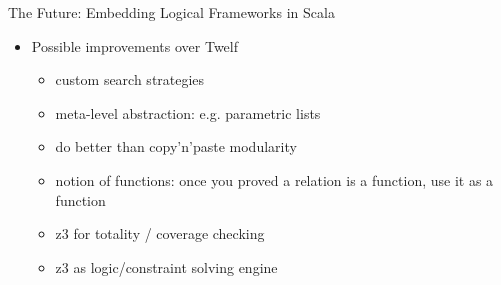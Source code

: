 \documentclass{beamer}
\begin{document}
\begin{frame}[fragile]{The Future: Embedding Logical Frameworks in Scala}
\begin{itemize}
\item Possible improvements over Twelf
\begin{itemize}
\item custom search strategies
\item meta-level abstraction: e.g. parametric lists
\item do better than copy'n'paste modularity
\item notion of functions: once you proved a relation is a function, use it as a function
\item z3 for totality / coverage checking
\item z3 as logic/constraint solving engine
\end{itemize}
\end{itemize}
\end{frame}
\end{document}
